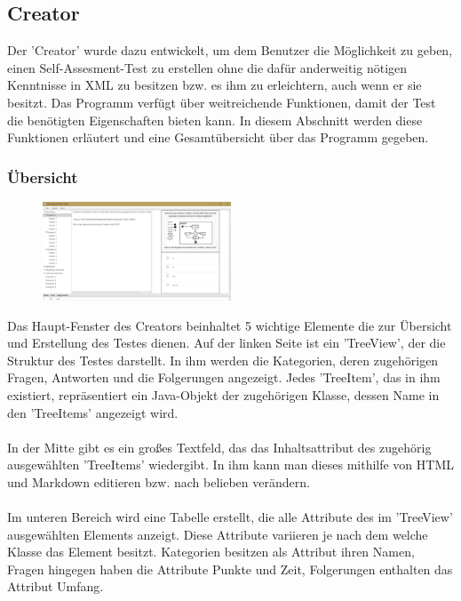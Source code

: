 \label{Julian}
\subsection{Creator}
Der 'Creator' wurde dazu entwickelt, um dem Benutzer die Möglichkeit zu geben, einen Self-Assesment-Test zu erstellen ohne die dafür anderweitig nötigen Kenntnisse in XML zu besitzen bzw. es ihm zu erleichtern, auch wenn er sie besitzt. Das Programm verfügt über weitreichende Funktionen, damit der Test die benötigten Eigenschaften bieten kann. In diesem Abschnitt werden diese Funktionen erläutert und eine Gesamtübersicht über das Programm gegeben. 

\subsubsection*{Übersicht}
\begin{figure}[htbp] 
  \centering
     \includegraphics[width=0.5\textwidth]{Julian_Images/Creator-Uebersicht.png}
  \caption{}
  \label{fig:Bild0}
\end{figure}
Das Haupt-Fenster des Creators beinhaltet 5 wichtige Elemente die zur Übersicht und Erstellung des Testes dienen. Auf der linken Seite ist ein 'TreeView', der die Struktur des Testes darstellt. In ihm werden die Kategorien, deren zugehörigen Fragen, Antworten und die Folgerungen angezeigt. Jedes 'TreeItem', das in ihm existiert, repräsentiert ein Java-Objekt der zugehörigen Klasse, dessen Name in den 'TreeItems' angezeigt wird.
\\
\\
In der Mitte gibt es ein großes Textfeld, das das Inhaltsattribut des zugehörig ausgewählten 'TreeItems' wiedergibt. In ihm kann man dieses mithilfe von HTML und Markdown editieren bzw. nach belieben verändern.
\\
\\
Im unteren Bereich wird eine Tabelle erstellt, die alle Attribute des im 'TreeView'  ausgewählten Elements anzeigt. Diese Attribute variieren je nach dem welche Klasse das Element besitzt. Kategorien besitzen als Attribut ihren Namen, Fragen hingegen haben die Attribute Punkte und Zeit, Folgerungen enthalten das Attribut Umfang.
